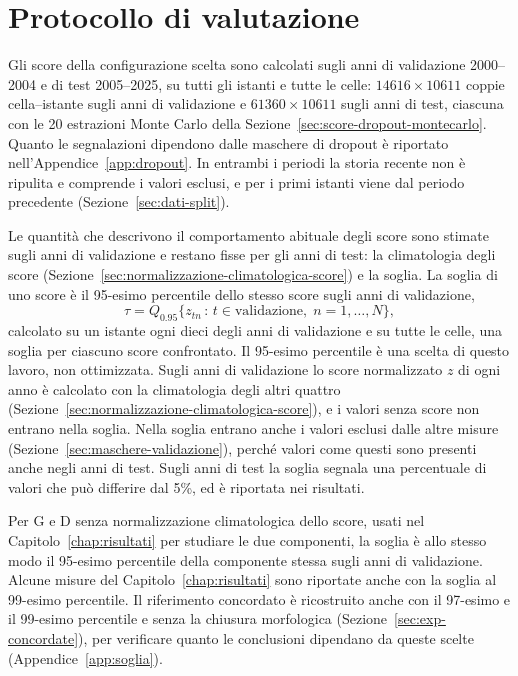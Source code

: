 \section{Protocollo di valutazione}
\label{sec:exp-protocollo}

Gli score della configurazione scelta sono calcolati sugli anni di validazione 2000--2004 e di test 2005--2025, su tutti gli istanti e tutte le celle: $14616\times10611$ coppie cella--istante sugli anni di validazione e $61360\times10611$ sugli anni di test, ciascuna con le 20 estrazioni Monte Carlo della Sezione~\ref{sec:score-dropout-montecarlo}. Quanto le segnalazioni dipendono dalle maschere di dropout è riportato nell'Appendice~\ref{app:dropout}. In entrambi i periodi la storia recente non è ripulita e comprende i valori esclusi, e per i primi istanti viene dal periodo precedente (Sezione~\ref{sec:dati-split}).

Le quantità che descrivono il comportamento abituale degli score sono stimate sugli anni di validazione e restano fisse per gli anni di test: la climatologia degli score (Sezione~\ref{sec:normalizzazione-climatologica-score}) e la soglia. La soglia di uno score è il 95-esimo percentile dello stesso score sugli anni di validazione,
\begin{equation}
\tau=Q_{0.95}\bigl\{z_{tn}\,:\,t\in\text{validazione},\;n=1,\dots,N\bigr\},
\label{eq:soglia}
\end{equation}
calcolato su un istante ogni dieci degli anni di validazione e su tutte le celle, una soglia per ciascuno score confrontato. Il 95-esimo percentile è una scelta di questo lavoro, non ottimizzata. Sugli anni di validazione lo score normalizzato $z$ di ogni anno è calcolato con la climatologia degli altri quattro (Sezione~\ref{sec:normalizzazione-climatologica-score}), e i valori senza score non entrano nella soglia. Nella soglia entrano anche i valori esclusi dalle altre misure (Sezione~\ref{sec:maschere-validazione}), perché valori come questi sono presenti anche negli anni di test. Sugli anni di test la soglia segnala una percentuale di valori che può differire dal 5\%, ed è riportata nei risultati.

Per G e D senza normalizzazione climatologica dello score, usati nel Capitolo~\ref{chap:risultati} per studiare le due componenti, la soglia è allo stesso modo il 95-esimo percentile della componente stessa sugli anni di validazione. Alcune misure del Capitolo~\ref{chap:risultati} sono riportate anche con la soglia al 99-esimo percentile. Il riferimento concordato è ricostruito anche con il 97-esimo e il 99-esimo percentile e senza la chiusura morfologica (Sezione~\ref{sec:exp-concordate}), per verificare quanto le conclusioni dipendano da queste scelte (Appendice~\ref{app:soglia}).

